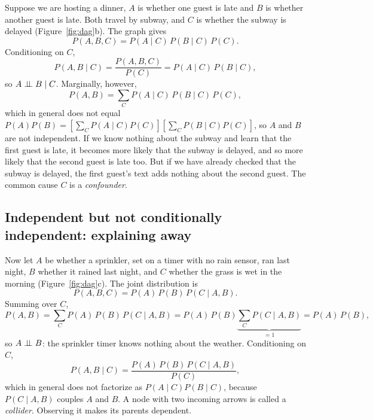 Suppose we are hosting a dinner, $A$ is whether one guest is late and $B$ is whether another guest is late. Both travel by subway, and $C$ is whether the subway is delayed (Figure~\ref{fig:dag}b). The graph gives
\begin{equation}
  P(A,B,C) = P(A\mid C)\,P(B\mid C)\,P(C).
\end{equation}
Conditioning on $C$,
\begin{equation}
  P(A,B\mid C) = \frac{P(A,B,C)}{P(C)} = P(A\mid C)\,P(B\mid C),
\end{equation}
so $A\perp\!\!\!\perp B\mid C$. Marginally, however,
\begin{equation}
  P(A,B) = \sum_C P(A\mid C)\,P(B\mid C)\,P(C),
\end{equation}
which in general does not equal $P(A)P(B)=\left[\sum_C P(A\mid C)P(C)\right]\left[\sum_C P(B\mid C)P(C)\right]$, so $A$ and $B$ are not independent. If we know nothing about the subway and learn that the first guest is late, it becomes more likely that the subway is delayed, and so more likely that the second guest is late too. But if we have already checked that the subway is delayed, the first guest's text adds nothing about the second guest. The common cause $C$ is a \emph{confounder}.

\subsection{Independent but not conditionally independent: explaining away}

Now let $A$ be whether a sprinkler, set on a timer with no rain sensor, ran last night, $B$ whether it rained last night, and $C$ whether the grass is wet in the morning (Figure~\ref{fig:dag}c). The joint distribution is
\begin{equation}
  P(A,B,C) = P(A)\,P(B)\,P(C\mid A,B).
\end{equation}
Summing over $C$,
\begin{equation}
  P(A,B) = \sum_C P(A)\,P(B)\,P(C\mid A,B) = P(A)\,P(B)\underbrace{\sum_C P(C\mid A,B)}_{=1} = P(A)\,P(B),
\end{equation}
so $A\perp\!\!\!\perp B$: the sprinkler timer knows nothing about the weather. Conditioning on $C$,
\begin{equation}
  P(A,B\mid C) = \frac{P(A)\,P(B)\,P(C\mid A,B)}{P(C)},
\end{equation}
which in general does not factorize as $P(A\mid C)P(B\mid C)$, because $P(C\mid A,B)$ couples $A$ and $B$. A node with two incoming arrows is called a \emph{collider}. Observing it makes its parents dependent.

